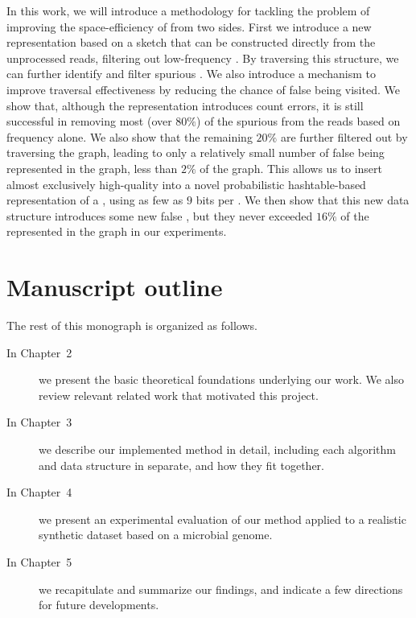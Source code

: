 In this work, we will introduce a methodology for tackling the problem of improving the space-efficiency of \dBG from two sides. First we introduce a new representation based on a \cm sketch \cite{Cormode2005} that can be constructed directly from the unprocessed reads, filtering out low-frequency . By traversing this structure, we can further identify and filter spurious . We also introduce a mechanism to improve traversal effectiveness by reducing the chance of false  being visited. We show that, although the  representation introduces count errors, it is still successful in removing most (over $80\%$) of the spurious  from the reads based on frequency alone. We also show that the remaining $20\%$ are further filtered out by traversing the graph, leading to only a relatively small number of false  being represented in the graph, less than $2\%$ of the graph. This allows us to insert almost exclusively high-quality  into a novel probabilistic hashtable-based representation of a \dBG, using as few as $9$ bits per \kmer. We then show that this new data structure introduces some new false , but they never exceeded $16\%$ of the  represented in the graph in our experiments.

\section{Manuscript outline}

The rest of this monograph is organized as follows.

\begin{description}
	\item[In Chapter~2] we present the basic theoretical foundations underlying our work. We also review relevant related work that motivated this project.
	\item[In Chapter~3] we describe our implemented method in detail, including each algorithm and data structure in separate, and how they fit together.
	\item[In Chapter~4] we present an experimental evaluation of our method applied to a realistic synthetic dataset based on a microbial genome.
	\item[In Chapter~5] we recapitulate and summarize our findings, and indicate a few directions for future developments.
\end{description}